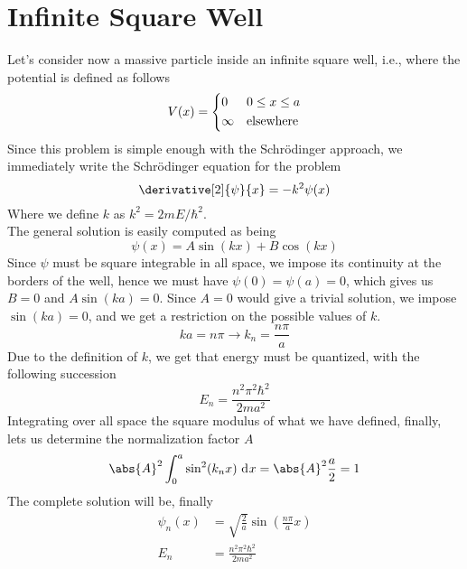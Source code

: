 \documentclass[a4paper, 11pt]{book}
\newcommand{\1}{\opr{\mathds{1}}}
\newcommand{\diff}[2][]{\ \mathrm{d}^{#1}#2}
\theoremstyle{plain}
\begin{document}
	\section{Infinite Square Well}
	Let's consider now a massive particle inside an infinite square well, i.e., where the potential is defined as follows
	\begin{equation*}
		V(x)=\begin{dcases}
			0&0\le x\le a\\
			\infty&\text{elsewhere}
		\end{dcases}
	\end{equation*}
	Since this problem is simple enough with the Schrödinger approach, we immediately write the Schrödinger equation for the problem
	\begin{equation}
		\derivative[2]{\psi}{x}=-k^2\psi(x)
		\label{eq:infsqwellsch}
	\end{equation}
	Where we define $k$ as $k^2=2mE/\hbar^2$.\\
	The general solution is easily computed as being
	\begin{equation}
		\psi(x)=A\sin(kx)+B\cos(kx)
		\label{eq:gensolinfsqw}
	\end{equation}
	Since $\psi$ must be square integrable in all space, we impose its continuity at the borders of the well, hence we must have $\psi(0)=\psi(a)=0$, which gives us $B=0$ and $A\sin(ka)=0$. Since $A=0$ would give a trivial solution, we impose $\sin(ka)=0$, and we get a restriction on the possible values of $k$.
	\begin{equation}
		ka=n\pi\longrightarrow k_n=\frac{n\pi}{a}
		\label{eq:kconstrinfsq}
	\end{equation}
	Due to the definition of $k$, we get that energy must be quantized, with the following succession
	\begin{equation}
		E_n=\frac{n^2\pi^2\hbar^2}{2ma^2}
		\label{eq:infsqenquant}
	\end{equation}
	Integrating over all space the square modulus of what we have defined, finally, lets us determine the normalization factor $A$
	\begin{equation}
		\abs{A}^2\int_{0}^{a}\sin^2(k_nx)\diff{x}=\abs{A}^2\frac{a}{2}=1
		\label{eq:norm}
	\end{equation}
	The complete solution will be, finally
	\begin{equation}
		\begin{aligned}
			\psi_n(x)&=\sqrt{\frac{2}{a}}\sin\left( \frac{n\pi}{a}x \right)\\
			E_n&=\frac{n^2\pi^2\hbar^2}{2ma^2}
		\end{aligned}
		\label{eq:infsqwellsol}
	\end{equation}
\end{document}
